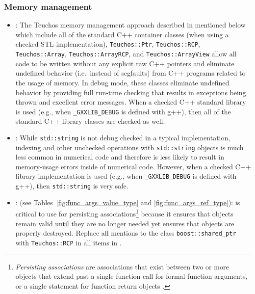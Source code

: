 %
\subsubsection{Memory management}
%


\begin{itemize}


{}\item\GCGAvoidRawPointers: The Teuchos memory management approach
described in {}\cite{TeuchosMemoryManagementGuide} mentioned below
which include all of the standard C++ container classes (when using a
checked STL implementation), {}\texttt{Teuchos::\-Ptr},
{}\texttt{Teuchos::\-RCP}, {}\texttt{Teuchos::\-Array},
{}\texttt{Teuchos::\-Array\-RCP}, and
{}\texttt{Teuchos::\-Array\-View} allow all code to be written without
any explicit raw C++ pointers and eliminate undefined behavior (i.e.\
instead of segfaults) from C++ programs related to the usage of
memory.  In debug mode, these classes eliminate undefined behavior by
providing full run-time checking that results in exceptions being
thrown and excellent error messages.  When a checked C++ standard
library is used (e.g., when {}\texttt{\_GXXLIB\_DEBUG} is defined with
g++), then all of the standard C++ library classes are checked as
well.


{}\item\GCGUseStdString: While {}\texttt{std\-::string} is not debug checked
in a typical implementation, indexing and other unchecked operations with
{}\texttt{std\-::string} objects is much less common in numerical code and
therefore is less likely to result in memory-usage errors inside of numerical
code.  However, when a checked C++ library implementation is used (e.g., when
{}\texttt{\_GXXLIB\_DEBUG} is defined with g++), then {}\texttt{std\-::string}
is very safe.


{}\item\GCGTeuchosRCP: (see Tables~\ref{fig:func_args_value_type} and
{}\ref{fig:func_args_ref_type}): {}\ttt{Teuchos\-::RCP} is critical to
use for persisting associations\footnote{\textit{Persisting
associations} are associations that exist between two or more objects
that extend past a single function call for formal function arguments,
or a single statement for function return objects
{}\cite{RefCountPtrBeginnersGuide, TeuchosMemoryManagementGuide}.} 
because it ensures that objects remain valid until they are no longer
needed yet ensures that objects are properly destroyed.  Replace all
mentions to the class {}\texttt{boost::\-shared\_ptr} with
{}\texttt{Teuchos::\-RCP} in all items in
{}\cite{C++CodingStandards05}.



\end{itemize}
